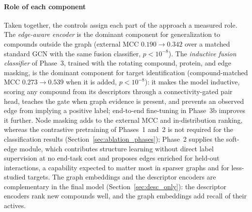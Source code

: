 \documentclass[11pt,letterpaper]{article}
\begin{document}
\paragraph{Role of each component}
Taken together, the controls assign each part of the approach a measured role. The \emph{edge-aware encoder} is the dominant component for generalization to compounds outside the graph (external MCC $0.190\to0.342$ over a matched standard GCN with the same fusion classifier, $p<10^{-8}$). The \emph{inductive fusion classifier} of Phase~3, trained with the rotating compound, protein, and edge masking, is the dominant component for target identification (compound-matched MCC $0.273\to0.539$ when it is added, $p<10^{-8}$): it makes the model inductive, scoring any compound from its descriptors through a connectivity-gated pair head, teaches the gate when graph evidence is present, and prevents an observed edge from implying a positive label; end-to-end fine-tuning in Phase~3b improves it further. Node masking adds to the external MCC and in-distribution ranking, whereas the contrastive pretraining of Phases~1 and~2 is not required for the classification results (Section~\ref{sec:ablation_phases}); Phase~2 supplies the soft-edge module, which contributes structure learning without direct label supervision at no end-task cost and proposes edges enriched for held-out interactions, a capability expected to matter most in sparser graphs and for less-studied targets. The graph embeddings and the descriptor encoders are complementary in the final model (Section~\ref{sec:desc_only}): the descriptor encoders rank new compounds well, and the graph embeddings add recall of their actives.
\end{document}
